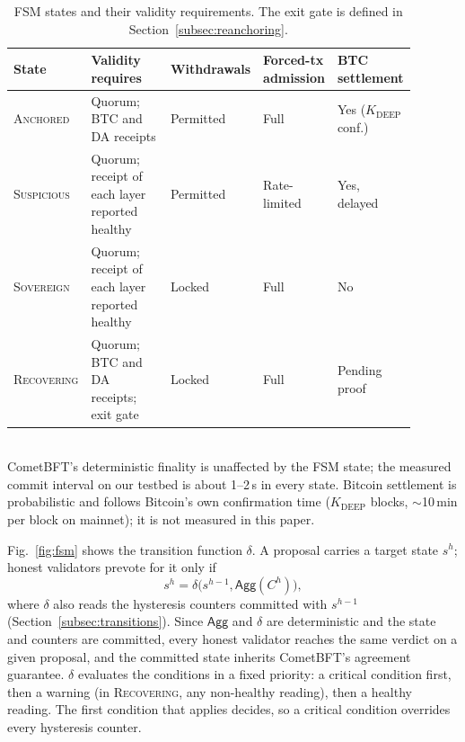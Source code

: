 \begin{table}[h]
\caption{FSM states and their validity requirements. The exit gate is defined
in Section~\ref{subsec:reanchoring}.}
\label{tab:fsm-states}
\centering
\footnotesize
\newcommand{\rcc}[1]{\raggedright\arraybackslash #1}
\begin{tabular}{@{}>{\rcc}p{0.12\linewidth}>{\rcc}p{0.31\linewidth}>{\rcc}p{0.13\linewidth}>{\rcc}p{0.15\linewidth}>{\rcc}p{0.18\linewidth}@{}}
\toprule
\textbf{State} & \textbf{Validity requires} & \textbf{Withdrawals} &
\textbf{Forced-tx admission} & \textbf{BTC settlement} \\
\midrule
\textsc{Anchored} & Quorum; BTC and DA receipts & Permitted & Full & Yes ($K_{\text{DEEP}}$ conf.) \\
\textsc{Suspicious} & Quorum; receipt of each layer reported healthy & Permitted & Rate-limited & Yes, delayed \\
\textsc{Sovereign} & Quorum; receipt of each layer reported healthy & Locked & Full & No \\
\textsc{Recovering} & Quorum; BTC and DA receipts; exit gate & Locked & Full & Pending proof \\
\bottomrule
\end{tabular}
\\[2pt]
\footnotesize CometBFT's deterministic finality is unaffected by the FSM state;
the measured commit interval on our testbed is about 1--2\,s in every state.
Bitcoin settlement is probabilistic and follows Bitcoin's own confirmation
time ($K_{\text{DEEP}}$ blocks, $\sim$10\,min per block on mainnet); it is
not measured in this paper.
\end{table}

Fig.~\ref{fig:fsm} shows the transition function $\delta$. A proposal
carries a target state $s^{h}$; honest validators prevote for it only if
\begin{equation}
s^{h} = \delta\bigl(s^{h-1}, \mathsf{Agg}(C^{h})\bigr),
\label{eq:delta}
\end{equation}
where $\delta$ also reads the hysteresis counters committed with $s^{h-1}$
(Section~\ref{subsec:transitions}). Since $\mathsf{Agg}$ and $\delta$ are
deterministic and the state and counters are committed, every honest
validator reaches the same verdict on a given proposal, and the committed
state inherits CometBFT's agreement guarantee. $\delta$ evaluates the
conditions in a fixed priority: a critical condition first, then a warning
(in \textsc{Recovering}, any non-healthy reading), then a healthy reading.
The first condition that applies decides, so a critical condition overrides
every hysteresis counter.

